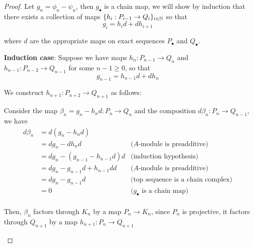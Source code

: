 \begin{proof}
	Let $g_n = \phi_n - \psi_n$, then $g_\bullet$ is a chain map, we will show by induction that there exists a collection of maps $\{h_i: P_{i-1} \to Q_i\}_{i \in \mathbb{N}}$ so that
	$$
		g_i = h_i d + d h_{i+1}
	$$
	
	where $d$ are the appropriate maps on exact sequences $P_\bullet$ and $Q_\bullet$. 
	
	\textbf{Induction case}: Suppose we have maps $h_n: P_{n-1} \to Q_n$ and $h_{n-1}: P_{n-2} \to Q_{n-1}$ for some $n -1 \geq 0$, so that
	$$
		g_{n-1} = h_{n-1} d + d h_n
	$$
	
	We construct $h_{n+1}: P_{n+2} \to Q_{n+1}$ as follows: 
	\begin{center}
	\end{center}
	
	Consider the map $\beta_n = g_n - h_n d: P_n \to Q_n$ and the composition $d \beta_n: P_n \to Q_{n-1}$, we have
	\begin{align*}
		d \beta_n
		&=d (g_n - h_n d) \\
		&= d g_n - d h_n d &\text{($A$-module is preadditive)}\\
		&= d g_n - (g_{n-1} - h_{n-1} d) d &\text{(induction hypothesis)}\\
		&= d g_n - g_{n-1} d + h_{n-1} d d &\text{($A$-module is preadditive)}\\
		&= d g_n - g_{n-1} d &\text{(top sequence is a chain complex)}\\
		&= 0 &\text{($g_\bullet$ is a chain map)}\\
	\end{align*}
	
	Then, $\beta_n$ factors through $K_n$ by a map $P_n \to K_n$, since $P_n$ is projective, it factors through $Q_{n+1}$ by a map $h_{n+1}: P_n \to Q_{n+1}$
	\begin{center}
	\end{center}
	

\end{proof}
